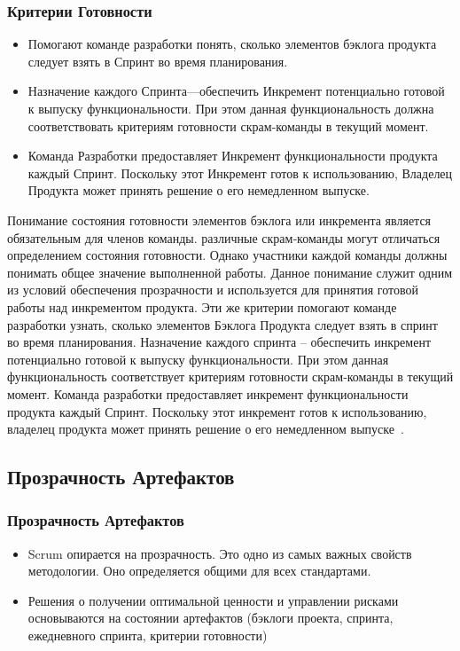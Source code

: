 \documentclass{../industrial-development}
\begin{document}
\begin{frame} \frametitle {Критерии Готовности}
\begin{itemize}
	\item Помогают команде разработки понять, \alert{сколько элементов бэклога продукта следует взять в Спринт} во время планирования.
 \item Назначение каждого Спринта---обеспечить Инкремент потенциально готовой к выпуску функциональности. При этом
данная функциональность должна соответствовать критериям готовности скрам‐команды в текущий момент.
 \item Команда Разработки предоставляет Инкремент функциональности продукта каждый Спринт. Поскольку этот Инкремент готов к использованию, Владелец Продукта может \alert{принять решение о его немедленном выпуске}.
\end{itemize}
\end {frame}
\lecturenotes
Понимание состояния готовности элементов бэклога или инкремента является
обязательным для членов команды. различные скрам‐команды могут отличаться
определением состояния готовности.
Однако участники каждой команды должны понимать общее значение выполненной
работы. Данное понимание служит одним из условий обеспечения прозрачности и
используется для принятия готовой работы над инкрементом продукта.
Эти же критерии помогают команде разработки узнать, сколько элементов Бэклога
Продукта следует взять в спринт во время планирования. Назначение каждого спринта –
обеспечить инкремент потенциально готовой к выпуску функциональности. При этом
данная функциональность соответствует критериям готовности скрам‐команды в текущий
момент.
Команда разработки предоставляет инкремент функциональности продукта каждый
Спринт. Поскольку этот инкремент готов к использованию, владелец продукта может
принять решение о его немедленном выпуске~\cite{Scrum}.

\subsection{Прозрачность Артефактов}
\begin{frame}\frametitle {Прозрачность Артефактов}

\begin{itemize}
\item Scrum опирается на прозрачность. Это одно из самых важных свойств методологии. Оно определяется \alert{общими для всех} стандартами. 
\item Решения о получении оптимальной ценности и управлении рисками основываются на состоянии артефактов (бэклоги проекта, спринта, ежедневного спринта, критерии готовности)
\end{itemize}
\end {frame}
\end{document}
